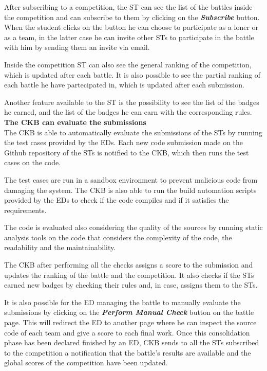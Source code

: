 After subscribing to a competition, the ST can see the list of the battles inside the competition and can subscribe to them by clicking on the \textbf{\textit{Subscribe}} button. When the student clicks on the button he can choose to participate as a loner or as a team, in the latter case he can invite other STs to participate in the battle with him by sending them an invite via email.

Inside the competition ST can also see the general ranking of the competition, which is updated after each battle. It is also possible to see the partial ranking of each battle he have partecipated in, which is updated after each submission. 

Another feature available to the ST is the possibility to see the list of the badges he earned, and the list of the badges he can earn with the corresponding rules. \\


\textbf{The CKB can evaluate the submissions} \\
The CKB is able to automatically evaluate the submissions of the STs by running the test cases provided by the EDs. Each new code submission made on the Github repository of the STs is notified to the CKB, which then runs the test cases on the code.

The test cases are run in a sandbox environment to prevent malicious code from damaging the system. The CKB is also able to run the build automation scripts provided by the EDs to check if the code compiles and if it satisfies the requirements. 

The code is evaluated also considering the quality of the sources by running static analysis tools on the code that considers the complexity of the code, the readability and the maintainability.

The CKB after performing all the checks assigns a score to the submission and updates the ranking of the battle and the competition. It also checks if the STs earned new badges by checking their rules and, in case, assigns them to the STs.

It is also possible for the ED managing the battle to manually evaluate the submissions by clicking on the \textbf{\textit{Perform Manual Check}} button on the battle page. This will redirect the ED to another page where he can inspect the source code of each team and give a score to each final work. Once this consolidation phase has been declared finished by an ED, CKB sends to all the STs subscribed to the competition a notification that the battle's results are available and the global scores of the competition have been updated.

